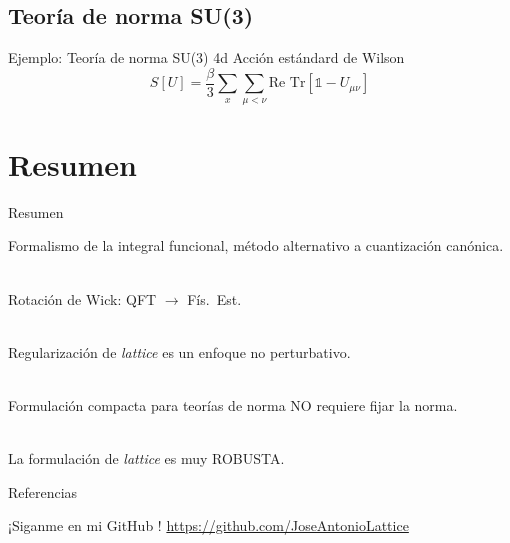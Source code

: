 \documentclass[11pt]{beamer}
\begin{document}
\subsection{Teoría de norma SU(3)}
\begin{frame}{Ejemplo: Teoría de norma SU(3) 4d}
Acción estándard de Wilson
$$ S[U] = \frac{\beta}{3}\sum_{x}\sum_{\mu < \nu} \text{Re Tr} \left[\mathds{1} - U_{\mu\nu} \right] $$
\end{frame}

\section{Resumen}
\begin{frame}{Resumen}

Formalismo de la integral funcional, método alternativo a cuantización canónica. \\~

Rotación de Wick: QFT $\to$ Fís.\ Est.\  \\~

Regularización de \emph{lattice} es un enfoque no perturbativo. \\~

Formulación compacta para teorías de norma NO requiere fijar la norma. \\~

La formulación de \emph{lattice} es muy ROBUSTA.
    
\end{frame}

\begin{frame}{Referencias}

¡Siganme en mi GitHub \faGithub !
\url{https://github.com/JoseAntonioLattice}
\end{frame}
\end{document}
